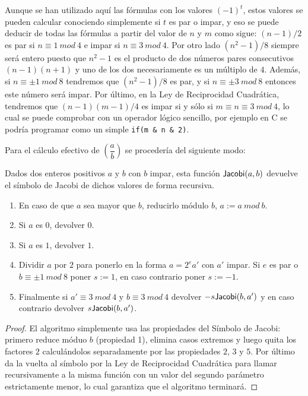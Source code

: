 \begin{remark}
Aunque se han utilizado aqu\'i las f\'ormulas con los valores $(-1)^t$, estos valores se pueden calcular conociendo simplemente si $t$ es par o impar, y eso se puede deducir
de todas las f\'ormulas a partir del valor de $n$ y $m$ como sigue: $(n-1)/2$ es par si $n \equiv 1~mod~4$ e impar si $n \equiv 3~mod~4$. Por otro lado $(n^2-1)/8$ siempre ser\'a
entero puesto que $n^2-1$ es el producto de dos n\'umeros pares consecutivos $(n-1)(n+1)$ y uno de los dos necesariamente es un m\'ultiplo de $4$. Adem\'as, si $n \equiv \pm 1~mod~8$
tendremos que $(n^2-1)/8$ es par, y si $n \equiv \pm 3 ~mod~ 8$ entonces este n\'umero ser\'a impar. Por \'ultimo, en la Ley de Reciprocidad Cuadr\'atica, tendremos que $(n-1)(m-1)/4$ es
impar si y s\'olo si $m \equiv n \equiv 3 ~mod~4$, lo cual se puede comprobar con un operador l\'ogico sencillo, por ejemplo en C se podr\'ia programar como un simple \verb!if(m & n & 2)!.
\end{remark}

Para el c\'alculo efectivo de $\left( \dfrac{a}{b} \right)$ se proceder\'ia del siguiente modo:

\begin{algorithm}
\label{algoSimJacob}
Dados dos enteros positivos $a$ y $b$ con $b$ impar, esta funci\'on ${\sf Jacobi}(a,b)$ devuelve
el s\'imbolo de Jacobi de dichos valores de forma recursiva.
\begin{enumerate}
\item En caso de que $a$ sea mayor que $b$, reducirlo m\'odulo $b$, $a := a ~ mod ~b$.
\item Si $a$ es $0$, devolver $0$.
\item Si $a$ es $1$, devolver $1$.
\item Dividir $a$ por $2$ para ponerlo en la forma $a = 2^e a'$ con $a'$ impar. Si $e$ es par o $b \equiv \pm 1 ~mod~8$ poner $s := 1$, en caso contrario poner $s := -1$.
\item Finalmente si $a' \equiv 3 ~mod~4$ y $b \equiv 3~mod~4$ devolver $-s {\sf Jacobi}(b,a')$ y en caso contrario devolver $s {\sf Jacobi}(b,a')$.
\end{enumerate}
\end{algorithm}
\begin{proof}
El algoritmo simplemente usa las propiedades del S\'imbolo de Jacobi: primero
reduce m\'oduo $b$ (propiedad 1), elimina casos extremos y
luego quita los factores $2$ calcul\'andolos
separadamente por las propiedades $2$, $3$ y $5$.
Por \'ultimo da la vuelta al s\'imbolo por la Ley de Reciprocidad Cuadr\'atica
para llamar recursivamente a la misma funci\'on con un valor del segundo
par\'ametro estrictamente menor, lo cual garantiza que el algoritmo terminar\'a.
\end{proof}

